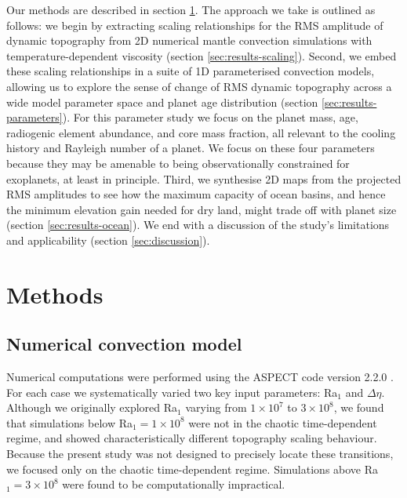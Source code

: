 \documentclass[trackchanges]{aastex63}
\begin{document}
Our methods are described in section \ref{sec:methods}. The approach we take is outlined as follows: we begin by extracting scaling relationships for the RMS amplitude of dynamic topography from 2D numerical mantle convection simulations with temperature-dependent viscosity (section \ref{sec:results-scaling}). Second, we embed these scaling relationships in a suite of 1D parameterised convection models, allowing us to explore the sense of change of RMS dynamic topography across a wide model parameter space and planet age distribution (section \ref{sec:results-parameters}). For this parameter study we focus on the planet mass, age, radiogenic element abundance, and core mass fraction, all relevant to the cooling history and Rayleigh number of a planet. We focus on these four parameters because they may be amenable to being observationally constrained for exoplanets, at least in principle. Third, we synthesise 2D maps from the projected RMS amplitudes to see how the maximum capacity of ocean basins, and hence the minimum elevation gain needed for dry land, might trade off with planet size (section \ref{sec:results-ocean}). We end with a discussion of the study's limitations and applicability (section \ref{sec:discussion}).



\section{Methods} \label{sec:methods}

\subsection{Numerical convection model} \label{sec:methods-numerical}

Numerical computations were performed using the ASPECT code version 2.2.0 \citep{KHB12,heister_high_2017, bangerth_aspect_2020}. For each case we systematically varied two key input parameters: Ra$_1$ and $\Delta \eta$. Although we originally explored Ra$_1$ varying from $1 \times 10^7$ to $3 \times 10^8$, we found that simulations below Ra$_1 = 1 \times 10^8$ were not in the chaotic time-dependent regime, and showed characteristically different topography scaling behaviour. Because the present study was not designed to precisely locate these transitions, we focused only on the chaotic time-dependent regime. Simulations above Ra$_1 = 3 \times 10^8$ were found to be computationally impractical.
\end{document}
